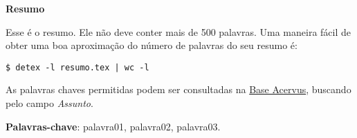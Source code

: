 \begin{center}
  \large{\textbf{Resumo}}
\end{center}

Esse é o resumo. Ele não deve conter mais de 500 palavras. Uma maneira
fácil de obter uma boa aproximação do número de palavras do seu resumo é:
\begin{lstlisting}
$ detex -l resumo.tex | wc -l
\end{lstlisting}

As palavras chaves permitidas podem ser consultadas na
\href{http://acervus.unicamp.br/}{Base Acervus}, buscando pelo campo
\emph{Assunto}.

\vspace{.2cm}
\textbf{Palavras-chave}:
palavra01, palavra02, palavra03.
